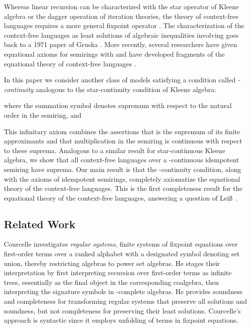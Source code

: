 \documentclass[copyright,creativecommons]{eptcs}
\theoremstyle{remark}
\begin{document}
Whereas linear recursion can be characterized with the star operator  of Kleene algebra or the dagger operation  of iteration theories, the theory of context-free languages requires a more general fixpoint operator . The characterization of the context-free languages as least solutions of algebraic inequalities involving  goes back to a 1971 paper of Gruska \cite{Gruska71}. More recently, several researchers have given equational axioms for semirings with  and have developed fragments of the equational theory of context-free languages \cite{cou86,esle2002,EsikLeiss05,Hopkins08a,Hopkins08b,leiss92b}.

In this paper we consider another class of models satisfying a condition called \emph{-continuity} analogous to the star-continuity condition of Kleene algebra:

where the summation symbol denotes supremum with respect to the natural order in the semiring, and

This infinitary axiom combines the assertions that  is the supremum of its finite approximants  and that multiplication in the semiring is continuous with respect to these suprema. Analogous to a similar result for star-continuous Kleene algebra, we show that all context-free languages over a -continuous idempotent semiring have suprema. Our main result is that the -continuity condition, along with the axioms of idempotent semirings, completely axiomatize the equational theory of the context-free languages. This is the first completeness result for the equational theory of the context-free languages, answering a question of Lei\ss\ \cite{leiss92b}.

\subsection{Related Work}
 
Courcelle \cite{cou86} investigates \emph{regular systems}, finite systems of fixpoint equations over first-order terms over a ranked alphabet with a designated symbol  denoting set union, thereby restricting algebras to power set algebras.  He stages their interpretation by first interpreting recursion over first-order terms as infinite trees, essentially as the final object in the corresponding coalgebra, then interpreting the signature symbols in -complete algebras.  He provides soundness and completeness for transforming regular systems that preserve all solutions and soundness, but not completeness for preserving their least solutions.  Courcelle's approach is syntactic since it employs unfolding of terms in fixpoint equations.
\end{document}
